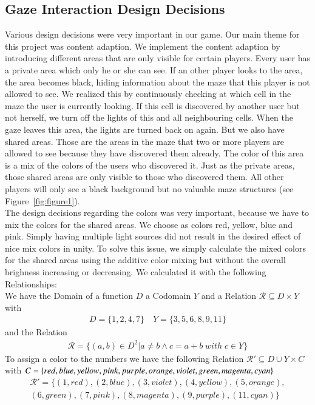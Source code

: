 \documentclass{sigchi}
\begin{document}
\subsection{Gaze Interaction Design Decisions}
Various design decisions were very important in our game. Our main theme for this project was content adaption. We implement the content adaption by introducing different areas that are only visible for certain players. Every user has a private area which only he or she can see. If an other player looks to the area, the area becomes black, hiding information about the maze that this player is not allowed to see. We realized this by continuously checking at which cell in the maze the user is currently looking. If this cell is discovered by another user but not herself, we turn off the lights of this and all neighbouring cells. When the gaze leaves this area, the lights are turned back on again. But we also have shared areas. Those are the areas in the maze that two or more players are allowed to see because they have discovered them already. The color of this area is a mix of the colors of the users who discovered it. Just as the private areas, those shared areas are only visible to those who discovered them. All other players will only see a black background but no valuable maze structures  (see Figure~\ref{fig:figure1}).\\ 
The design decisions regarding the colors was very important, because we have to mix the colors for the shared areas. We choose as colors red, yellow, blue and pink. Simply having multiple light sources did not result in the desired effect of nice mix colors in unity. To solve this issue, we simply calculate the mixed colors for the shared areas using the additive color mixing but without the overall brighness increasing or decreasing. We calculated it with the following Relationships: \\
We have the Domain of a function $D$ a Codomain $Y$ and a Relation $\mathcal{R} \subseteq D \times Y$ with 
\begin{align*} D = \{1,2,4,7\}   \quad Y = \{3,5,6,8,9,11\} \end{align*} and the Relation \begin{align*} \mathcal{R} = \{(a,b) \in  D^2 | a \neq b \wedge c=a+b \; with\; c \in Y \} \end{align*}
To assign a color to the numbers we have the following Relation $\mathcal{R}' \subseteq D \cup Y \times C$ with $ C= \{red, blue, yellow, pink, purple, orange, violet, green, \\magenta, cyan\} $
\begin{align*} \mathcal{R}' = \{(1,red),(2,blue),(3,violet), (4,yellow), (5,orange), \\ (6,green), (7,pink), (8,magenta), (9,purple), (11,cyan)\} \end{align*}
\end{document}
